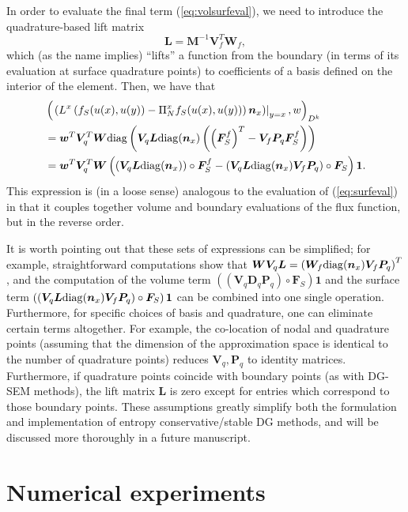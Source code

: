 \documentclass[preprint,10pt]{article}
\theoremstyle{definition}
\theoremstyle{lemma}
\theoremstyle{theorem}
\theoremstyle{assumption}
\newcommand{\LRp}[1]{\left( #1 \right)}
\begin{document}
In order to evaluate the final term (\ref{eq:volsurfeval}), we need to introduce the quadrature-based lift matrix 
\[
\bm{L} = \bm{M}^{-1}\bm{V}_f^T \bm{W}_f,
\]
which (as the name implies) ``lifts'' a function from the boundary (in terms of its evaluation at surface quadrature points) to coefficients of a basis defined on the interior of the element.  Then, we have that
\begin{align*}
&\LRp{\left.\LRp{L^x\LRp{{f}_S({u}(x),{u}(y)) - \Pi_N^x{f}_S({u}(x),{u}(y))}\bm{n}_x}\right|_{y=x},{w}}_{D^k} \\
&= \bm{w}^T\bm{V}_q^T\bm{W}{\rm diag}\LRp{\bm{V}_q\bm{L}{\rm diag}(\bm{n}_x) \LRp{\LRp{\bm{F}_S^f}^T - \bm{V}_f\bm{P}_q \bm{F}_S^f}}\\
&= \bm{w}^T\bm{V}_q^T\bm{W}\LRp{ \LRp{\bm{V}_q\bm{L}{\rm diag}(\bm{n}_x)} \circ {\bm{F}_S^f} - \LRp{\bm{V}_q\bm{L}{\rm diag}(\bm{n}_x)\bm{V}_f\bm{P}_q}\circ {\bm{F}_S}}\bm{1}.
\end{align*}
This expression is (in a loose sense) analogous to the evaluation of (\ref{eq:surfeval}) in that it couples together volume and boundary evaluations of the flux function, but in the reverse order.  

It is worth pointing out that these sets of expressions can be simplified; for example, straightforward computations show that $\bm{W}\bm{V}_q\bm{L} = \LRp{\bm{W}_f{\rm diag}(\bm{n}_x)\bm{V}_f\bm{P}_q}^T$, and the computation of the volume term $\LRp{\LRp{\bm{V}_q \bm{D}_q \bm{P}_q} \circ \bm{F}_S}\bm{1}$ and the surface term $\LRp{\LRp{\bm{V}_q\bm{L}{\rm diag}(\bm{n}_x)\bm{V}_f\bm{P}_q}\circ {\bm{F}_S}}\bm{1}$ can be combined into one single operation.  Furthermore, for specific choices of basis and quadrature, one can eliminate certain terms altogether.  For example, the co-location of nodal and quadrature points (assuming that the dimension of the approximation space is identical to the number of quadrature points) reduces $\bm{V}_q, \bm{P}_q$ to identity matrices.  Furthermore, if quadrature points coincide with boundary points (as with DG-SEM methods), the lift matrix $\bm{L}$ is zero except for entries which correspond to those boundary points.  These assumptions greatly simplify both the formulation and implementation of entropy conservative/stable DG methods, and will be discussed more thoroughly in a future manuscript.  


\section{Numerical experiments}
\label{sec:num}
\end{document}
